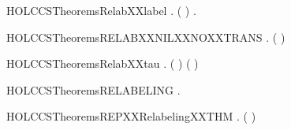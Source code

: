 \newcommand{\HOLCCSTheoremsRELABXXcasesXXEQ}{\UseVerbatim{HOLCCSTheoremsRELABXXcasesXXEQ}}
\begin{SaveVerbatim}{HOLCCSTheoremsRelabXXlabel}
\HOLTokenTurnstile{} \HOLSymConst{\HOLTokenForall{}}  . (   \HOLSymConst{=}  ) \HOLSymConst{\HOLTokenImp{}} \HOLSymConst{\HOLTokenExists{}}.  \HOLSymConst{=}  
\end{SaveVerbatim}
\newcommand{\HOLCCSTheoremsRelabXXlabel}{\UseVerbatim{HOLCCSTheoremsRelabXXlabel}}
\begin{SaveVerbatim}{HOLCCSTheoremsRELABXXNILXXNOXXTRANS}
\HOLTokenTurnstile{} \HOLSymConst{\HOLTokenForall{}}  . \HOLSymConst{\HOLTokenNeg{}}(   \HOLTokenTransBegin{}\HOLTokenTransEnd {})
\end{SaveVerbatim}
\newcommand{\HOLCCSTheoremsRELABXXNILXXNOXXTRANS}{\UseVerbatim{HOLCCSTheoremsRELABXXNILXXNOXXTRANS}}
\begin{SaveVerbatim}{HOLCCSTheoremsRelabXXtau}
\HOLTokenTurnstile{} \HOLSymConst{\HOLTokenForall{}} . (   \HOLSymConst{=} \HOLConst{\ensuremath{\tau}}) \HOLSymConst{\HOLTokenImp{}} ( \HOLSymConst{=} \HOLConst{\ensuremath{\tau}})
\end{SaveVerbatim}
\newcommand{\HOLCCSTheoremsRelabXXtau}{\UseVerbatim{HOLCCSTheoremsRelabXXtau}}
\begin{SaveVerbatim}{HOLCCSTheoremsRELABELING}
\HOLTokenTurnstile{} \HOLSymConst{\HOLTokenForall{}}   .  \HOLTokenTransBegin{}\HOLTokenTransEnd {} \HOLSymConst{\HOLTokenImp{}}    \HOLTokenTransBegin{}  \HOLTokenTransEnd {}  
\end{SaveVerbatim}
\newcommand{\HOLCCSTheoremsRELABELING}{\UseVerbatim{HOLCCSTheoremsRELABELING}}
\begin{SaveVerbatim}{HOLCCSTheoremsREPXXRelabelingXXTHM}
\HOLTokenTurnstile{} \HOLSymConst{\HOLTokenForall{}}.  ( )
\end{SaveVerbatim}
